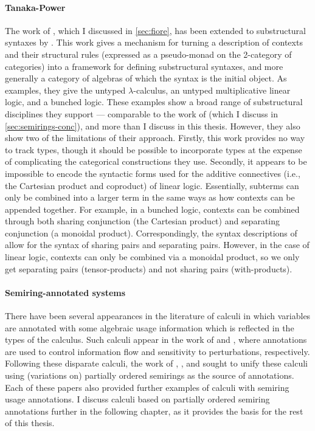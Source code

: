 \paragraph{Tanaka-Power}
The work of \citet{FPT99}, which I discussed in \cref{sec:fiore}, has been
extended to substructural syntaxes by \citet{TP06}.
This work gives a mechanism for turning a description of contexts and their
structural rules (expressed as a pseudo-monad on the 2-category of categories)
into a framework for defining substructural syntaxes, and more generally a
category of algebras of which the syntax is the initial object.
As examples, they give the untyped $\lambda$-calculus, an untyped multiplicative
linear logic, and a bunched logic.
These examples show a broad range of substructural disciplines they support ---
comparable to the work of \citet{LicataSR17} (which I discuss in
\cref{sec:semirings-conc}), and more than I discuss in this thesis.
However, they also show two of the limitations of their approach.
Firstly, this work provides no way to track types, though it should be possible
to incorporate types at the expense of complicating the categorical
constructions they use.
Secondly, it appears to be impossible to encode the syntactic forms used for the
additive connectives (i.e., the Cartesian product and coproduct) of linear
logic.
Essentially, subterms can only be combined into a larger term in the same ways
as how contexts can be appended together.
For example, in a bunched logic, contexts can be combined through both sharing
conjunction (the Cartesian product) and separating conjunction
(a monoidal product).
Correspondingly, the syntax descriptions of \citeauthor{TP06} allow for the
syntax of sharing pairs and separating pairs.
However, in the case of linear logic, contexts can only be combined via a
monoidal product, so we only get separating pairs (tensor-products) and not
sharing pairs (with-products).

\paragraph{Semiring-annotated systems}
There have been several appearances in the literature of calculi in which
variables are annotated with some algebraic usage information which is reflected
in the types of the calculus.
Such calculi appear in the work of \citet{abadi99core} and
\citet{reed10distance}, where annotations are used to control information flow
and sensitivity to perturbations, respectively.
Following these disparate calculi, the work of \citet{BrunelGMZ14},
\citet{GhicaS14}, and \citet{POM14} sought to unify these calculi using
(variations on) partially ordered semirings as the source of annotations.
Each of these papers also provided further examples of calculi with semiring
usage annotations.
I discuss calculi based on partially ordered semiring annotations further in the
following chapter, as it provides the basis for the rest of this thesis.
